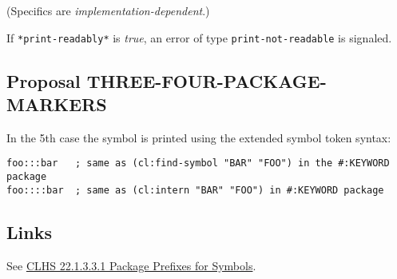 \documentclass[11pt]{article}
\begin{document}
(Specifics are \emph{implementation-dependent}.)

If \texttt{*print-readably*} is \emph{true}, an error of type \texttt{print-not-readable} is signaled.
\subsection{Proposal THREE-FOUR-PACKAGE-MARKERS}
\label{sec:org236f87a}
In the 5th case the symbol is printed using the extended symbol token syntax:
\begin{verbatim}
foo:::bar   ; same as (cl:find-symbol "BAR" "FOO") in the #:KEYWORD package
foo::::bar  ; same as (cl:intern "BAR" "FOO") in #:KEYWORD package
\end{verbatim}
\subsection{Links}
\label{sec:orgd745b41}
See \href{https://www.lispworks.com/documentation/HyperSpec/Body/22\_acca.htm}{CLHS 22.1.3.3.1 Package Prefixes for Symbols}.
\end{document}
